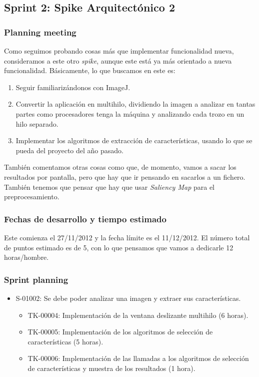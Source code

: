 \subsection{Sprint 2: Spike Arquitectónico 2}
\subsubsection*{Planning meeting}
Como seguimos probando cosas más que implementar funcionalidad nueva, consideramos a este \sprint{} otro \textit{spike}, aunque este está ya más orientado a nueva funcionalidad. Básicamente, lo que buscamos en este \sprint{} es:

\begin{enumerate}
\item Seguir familiarizándonos con ImageJ.
\item Convertir la aplicación en multihilo, dividiendo la imagen a analizar en tantas partes como procesadores tenga la máquina y analizando cada trozo en un hilo separado.
\item Implementar los algoritmos de extracción de características, usando lo que se pueda del proyecto del año pasado.
\end{enumerate}

También comentamos otras cosas como que, de momento, vamos a sacar los resultados por pantalla, pero que hay que ir pensando en sacarlos a un fichero. También tenemos que pensar que hay que usar \textit{Saliency Map} para el preprocesamiento.

\subsubsection*{Fechas de desarrollo y tiempo estimado}
Este \sprint{} comienza el 27/11/2012 y la fecha límite es el 11/12/2012. El número total de puntos estimado es de 5, con lo que pensamos que vamos a dedicarle 12 horas/hombre.

\subsubsection*{Sprint planning}
\begin{itemize}
\item S-01002: Se debe poder analizar una imagen y extraer sus características.
	\begin{itemize}
	\item TK-00004: Implementación de la ventana deslizante multihilo (6 horas).
	\item TK-00005: Implementación de los algoritmos de selección de características (5 horas).
	\item TK-00006: Implementación de las llamadas a los algoritmos de selección de características y muestra de los resultados (1 hora).
	\end{itemize}
\end{itemize}

